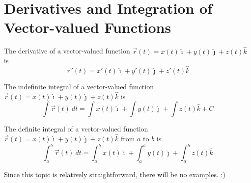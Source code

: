 \chapter{Derivatives and Integration of Vector-valued Functions}

The derivative of a vector-valued function $\vec{r}(t) = x(t)\hat{\imath} +
    y(t)\hat{\jmath} + z(t)\hat{k}$ is \[\vec{r}'(t) = x'(t)\hat{\imath} +
    y'(t)\hat{\jmath} + z'(t)\hat{k}\]

The indefinite integral of a vector-valued function $\vec{r}(t) =
    x(t)\hat{\imath} + y(t)\hat{\jmath} + z(t)\hat{k}$ is \[\int \vec{r}(t)\ dt = \int x(t)\hat{\imath} + \int y(t)\hat{\jmath} + \int z(t)\hat{k} + C\]

The definite integral of a vector-valued function $\vec{r}(t) =
    x(t)\hat{\imath} + y(t)\hat{\jmath} + z(t)\hat{k}$ from $a$ to $b$ is \[\int_a^b \vec{r}(t)\ dt = \int_a^b x(t)\hat{\imath} + \int_a^b y(t)\hat{\jmath} + \int_a^b z(t)\hat{k}\]

Since this topic is relatively straightforward, there will be no examples. :)
